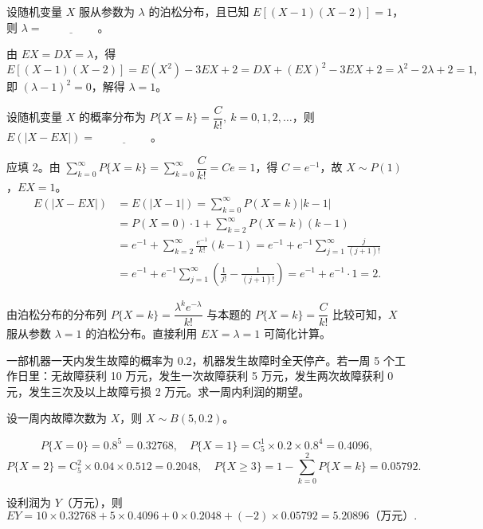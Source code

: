 \documentclass[lang=cn,11pt]{elegantbook}
\begin{document}
\begin{exercise}\label{exer:4-s8-poisson}
设随机变量 \(X\) 服从参数为 \(\lambda\) 的泊松分布，且已知 \(E[(X-1)(X-2)] = 1\)，则 \(\lambda =\,\underline{\hspace{2cm}}\)。
\end{exercise}
\begin{solution}
由 \(EX = DX = \lambda\)，得
\[
E[(X-1)(X-2)] = E(X^2) - 3EX + 2 = DX + (EX)^2 - 3EX + 2 = \lambda^2 - 2\lambda + 2 = 1,
\]
即 \((\lambda - 1)^2 = 0\)，解得 \(\lambda = 1\)。
\end{solution}

\begin{exercise}\label{exer:4-5-poisson}
设随机变量 \(X\) 的概率分布为 \(P\{X=k\} = \dfrac{C}{k!},\ k=0,1,2,\dots\)，则 \(E(|X - EX|) =\,\underline{\hspace{2cm}}\)。
\end{exercise}
\begin{solution}
应填 2。由 \(\sum\limits_{k=0}^{\infty} P\{X=k\} = \sum\limits_{k=0}^{\infty} \dfrac{C}{k!} = Ce = 1\)，得 \(C = e^{-1}\)，故 \(X \sim P(1)\)，\(EX = 1\)。
\[
\begin{aligned}
E(|X - EX|) &= E(|X - 1|) = \sum_{k=0}^{\infty} P(X=k)|k-1| \\
&= P(X=0) \cdot 1 + \sum_{k=2}^{\infty} P(X=k)(k-1) \\
&= e^{-1} + \sum_{k=2}^{\infty} \frac{e^{-1}}{k!}(k-1) = e^{-1} + e^{-1}\sum_{j=1}^{\infty}\frac{j}{(j+1)!} \\
&= e^{-1} + e^{-1}\sum_{j=1}^{\infty}\left(\frac{1}{j!} - \frac{1}{(j+1)!}\right) = e^{-1} + e^{-1}\cdot 1 = 2.
\end{aligned}
\]
\end{solution}

\begin{note}
由泊松分布的分布列 \(P\{X=k\} = \dfrac{\lambda^k e^{-\lambda}}{k!}\) 与本题的 \(P\{X=k\} = \dfrac{C}{k!}\) 比较可知，\(X\) 服从参数 \(\lambda = 1\) 的泊松分布。直接利用 \(EX = \lambda = 1\) 可简化计算。
\end{note}


\begin{exercise}\label{exer:4-s11-machine}
一部机器一天内发生故障的概率为 0.2，机器发生故障时全天停产。若一周 5 个工作日里：无故障获利 10 万元，发生一次故障获利 5 万元，发生两次故障获利 0 元，发生三次及以上故障亏损 2 万元。求一周内利润的期望。
\end{exercise}

\begin{solution}
设一周内故障次数为 \(X\)，则 \(X \sim B(5, 0.2)\)。

\[
P\{X=0\} = 0.8^5 = 0.32768,\quad P\{X=1\} = \mathrm{C}_5^1 \times 0.2 \times 0.8^4 = 0.4096,
\]
\[
P\{X=2\} = \mathrm{C}_5^2 \times 0.04 \times 0.512 = 0.2048,\quad P\{X \geqslant 3\} = 1 - \sum_{k=0}^{2}P\{X=k\} = 0.05792.
\]

设利润为 \(Y\)（万元），则
\[
EY = 10 \times 0.32768 + 5 \times 0.4096 + 0 \times 0.2048 + (-2) \times 0.05792 = 5.20896 \text{（万元）}.
\]
\end{solution}
\end{document}
